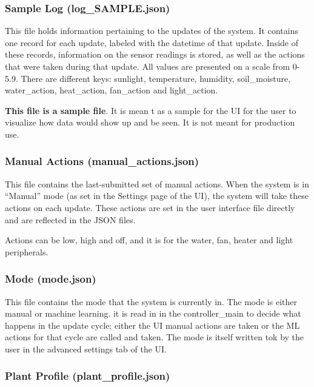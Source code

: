 \documentclass[
]{article}
\begin{document}
\hypertarget{sample-log-log_sample.json}{%
\subsubsection{Sample Log
(log\_SAMPLE.json)}\label{sample-log-log_sample.json}}

This file holds information pertaining to the updates of the system. It
contains one record for each update, labeled with the datetime of that
update. Inside of these records, information on the sensor readings is
stored, as well as the actions that were taken during that update. All
values are presented on a scale from 0-5.9. There are different keys:
sunlight, temperature, humidity, soil\_moisture, water\_action,
heat\_action, fan\_action and light\_action.

\textbf{This file is a sample file}. It is mean t as a sample for the UI
for the user to visualize how data would show up and be seen. It is not
meant for production use.

\hypertarget{manual-actions-manual_actions.json}{%
\subsubsection{Manual Actions
(manual\_actions.json)}\label{manual-actions-manual_actions.json}}

This file contains the last-submitted set of manual actions. When the
system is in ``Manual'' mode (as set in the Settings page of the UI),
the system will take these actions on each update. These actions are set
in the user interface file directly and are reflected in the JSON files.

Actions can be low, high and off, and it is for the water, fan, heater
and light peripherals.

\hypertarget{mode-mode.json}{%
\subsubsection{Mode (mode.json)}\label{mode-mode.json}}

This file contains the mode that the system is currently in. The mode is
either manual or machine learning. it is read in in the controller\_main
to decide what happens in the update cycle; either the UI manual actions
are taken or the ML actions for that cycle are called and taken. The
mode is itself written tok by the user in the advanced settings tab of
the UI.

\hypertarget{plant-profile-plant_profile.json}{%
\subsubsection{Plant Profile
(plant\_profile.json)}\label{plant-profile-plant_profile.json}}
\end{document}

